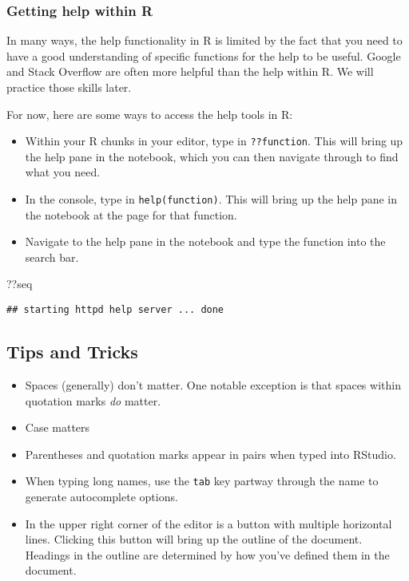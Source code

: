 \documentclass[
]{article}
\newenvironment{Shaded}{\begin{snugshade}}{\end{snugshade}}
\newcommand{\NormalTok}[1]{#1}
\begin{document}
\hypertarget{getting-help-within-r}{%
\subsubsection{Getting help within R}\label{getting-help-within-r}}

In many ways, the help functionality in R is limited by the fact that
you need to have a good understanding of specific functions for the help
to be useful. Google and Stack Overflow are often more helpful than the
help within R. We will practice those skills later.

For now, here are some ways to access the help tools in R:

\begin{itemize}
\item
  Within your R chunks in your editor, type in \texttt{??function}. This
  will bring up the help pane in the notebook, which you can then
  navigate through to find what you need.
\item
  In the console, type in \texttt{help(function)}. This will bring up
  the help pane in the notebook at the page for that function.
\item
  Navigate to the help pane in the notebook and type the function into
  the search bar.
\end{itemize}

\begin{Shaded}
\begin{Highlighting}[]
\NormalTok{??seq}
\end{Highlighting}
\end{Shaded}

\begin{verbatim}
## starting httpd help server ... done
\end{verbatim}

\hypertarget{tips-and-tricks}{%
\subsection{Tips and Tricks}\label{tips-and-tricks}}

\begin{itemize}
\item
  Spaces (generally) don't matter. One notable exception is that spaces
  within quotation marks \emph{do} matter.
\item
  Case matters
\item
  Parentheses and quotation marks appear in pairs when typed into
  RStudio.
\item
  When typing long names, use the \texttt{tab} key partway through the
  name to generate autocomplete options.
\item
  In the upper right corner of the editor is a button with multiple
  horizontal lines. Clicking this button will bring up the outline of
  the document. Headings in the outline are determined by how you've
  defined them in the document.
\end{itemize}
\end{document}
